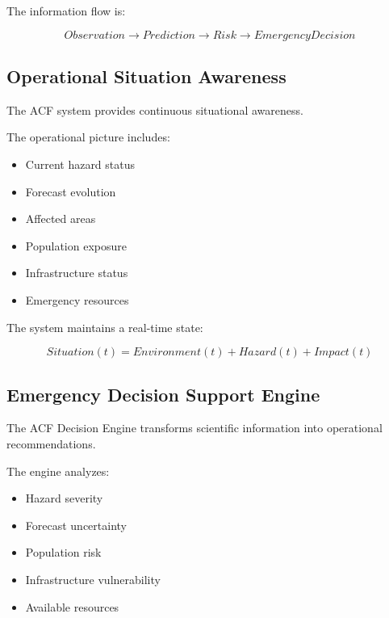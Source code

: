 The information flow is:

\[
Observation
\rightarrow
Prediction
\rightarrow
Risk
\rightarrow
EmergencyDecision
\]



\subsection{Operational Situation Awareness}

The ACF system provides continuous situational awareness.

The operational picture includes:

\begin{itemize}

\item Current hazard status

\item Forecast evolution

\item Affected areas

\item Population exposure

\item Infrastructure status

\item Emergency resources

\end{itemize}


The system maintains a real-time state:

\[
Situation(t)
=
Environment(t)
+
Hazard(t)
+
Impact(t)
\]



\subsection{Emergency Decision Support Engine}

The ACF Decision Engine transforms scientific information into
operational recommendations.

The engine analyzes:

\begin{itemize}

\item Hazard severity

\item Forecast uncertainty

\item Population risk

\item Infrastructure vulnerability

\item Available resources

\end{itemize}



